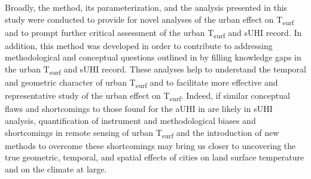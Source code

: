 \begin{bibunit}
Broadly, the method, its parameterization, and the analysis presented in this study were conducted to provide for novel analyses of the urban effect on T\textsubscript{surf} and to prompt further critical assessment of the urban T\textsubscript{surf} and sUHI record. In addition, this method was developed in order to contribute to addressing methodological and conceptual questions outlined in \citet{Roth1989} by filling knowledge gaps in the urban T\textsubscript{surf} and sUHI record. These analyses help to understand the temporal and geometric character of urban T\textsubscript{surf} and to facilitate more effective and representative study of the urban effect on T\textsubscript{surf}. Indeed, if similar conceptual flaws and shortcomings to those found for the aUHI in \citet{Stewart2011} are likely in sUHI analysis, quantification of instrument and methodological biases and shortcomings in remote sensing of urban T\textsubscript{surf} and the introduction of new methods to overcome these shortcomings may bring us closer to uncovering the true geometric, temporal, and spatial effects of cities on land surface temperature and on the climate at large.

\cleardoublepage 
{}  
\renewcommand*{\bibname}{References}


\putbib
\end{bibunit}